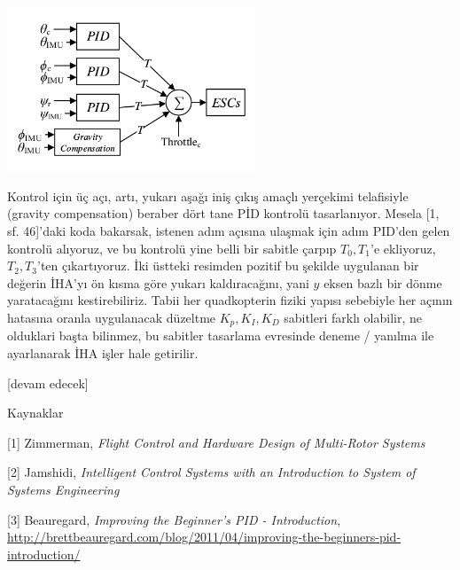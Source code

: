 \documentclass[12pt,fleqn]{article}\usepackage{../../common}
\begin{document}
\includegraphics[width=20em]{phy_030_pid_05.png}

Kontrol için üç açı, artı, yukarı aşağı iniş çıkış amaçlı yerçekimi
telafisiyle (gravity compensation) beraber dört tane PİD kontrolü
tasarlanıyor. Mesela [1, sf. 46]'daki koda bakarsak, istenen adım açısına
ulaşmak için adım PID'den gelen kontrolü alıyoruz, ve bu kontrolü yine
belli bir sabitle çarpıp $T_0,T_1$'e ekliyoruz, $T_2,T_3$'ten
çıkartıyoruz. İki üstteki resimden pozitif bu şekilde uygulanan bir değerin
İHA'yı ön kısma göre yukarı kaldıracağını, yani $y$ eksen bazlı bir dönme
yaratacağını kestirebiliriz. Tabii her quadkopterin fiziki yapısı sebebiyle
her açının hatasına oranla uygulanacak düzeltme $K_p,K_I,K_D$ sabitleri
farklı olabilir, ne olduklari başta bilinmez, bu sabitler tasarlama
evresinde deneme / yanılma ile ayarlanarak İHA işler hale getirilir.














[devam edecek]

Kaynaklar

[1] Zimmerman, {\em Flight Control and Hardware Design of Multi-Rotor Systems}

[2] Jamshidi, {\em Intelligent Control Systems with an Introduction to System of Systems Engineering}

[3] Beauregard, {\em Improving the Beginner's PID - Introduction}, 
    \url{http://brettbeauregard.com/blog/2011/04/improving-the-beginners-pid-introduction/}
\end{document}
